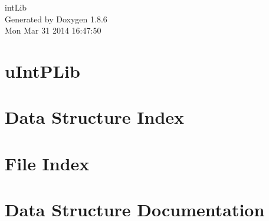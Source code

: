 \documentclass[twoside]{book}
\newcommand{\clearemptydoublepage}{%
  \newpage{\pagestyle{empty}\cleardoublepage}%
}
\begin{document}
\hypersetup{pageanchor=false}
\begin{titlepage}
\vspace*{7cm}
\begin{center}%
{\Large int\-Lib }\\
\vspace*{1cm}
{\large Generated by Doxygen 1.8.6}\\
\vspace*{0.5cm}
{\small Mon Mar 31 2014 16:47:50}\\
\end{center}
\end{titlepage}
\clearemptydoublepage
\tableofcontents
\clearemptydoublepage
{}
\hypersetup{pageanchor=true}

\chapter{u\-Int\-P\-Lib}
\label{md__r_e_a_d_m_e}
\hypertarget{md__r_e_a_d_m_e}{}

\chapter{Data Structure Index}

\chapter{File Index}

\chapter{Data Structure Documentation}




\end{document}
